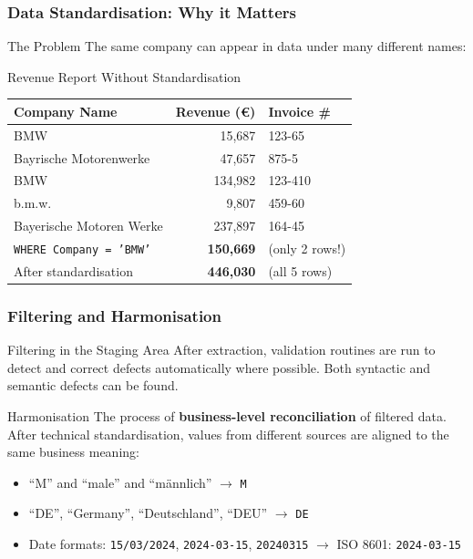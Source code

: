 \begin{frame}
  \frametitle{Data Standardisation: Why it Matters}

  \begin{block}{The Problem}
    The same company can appear in data under many different names:
  \end{block}

  \begin{examples}{Revenue Report Without Standardisation}
    \begin{tabularx}{\linewidth}{@{}l r l@{}}
      \toprule
      \textbf{Company Name}         & \textbf{Revenue (\euro{})} & \textbf{Invoice \#} \\
      \midrule
      BMW                           & 15,687       & 123-65 \\
      Bayrische Motorenwerke        & 47,657       & 875-5  \\
      BMW                           & 134,982      & 123-410 \\
      b.m.w.                        & 9,807        & 459-60 \\
      Bayerische Motoren Werke      & 237,897      & 164-45 \\
      \midrule
      \texttt{WHERE Company = 'BMW'} & \textbf{150,669} & (only 2 rows!) \\
      After standardisation         & \textbf{446,030} & (all 5 rows) \\
      \bottomrule
    \end{tabularx}
  \end{examples}
\end{frame}

\begin{frame}
  \frametitle{Filtering and Harmonisation}

  \begin{block}{Filtering in the Staging Area}
    After extraction, validation routines are run to detect and correct
    defects automatically where possible.
    Both syntactic and semantic defects can be found.
  \end{block}

  \begin{block}{Harmonisation}
    The process of \textbf{business-level reconciliation} of filtered data.
    After technical standardisation, values from different sources are
    aligned to the same business meaning:
    \begin{itemize}
      \item ``M'' and ``male'' and ``männlich'' $\to$ \texttt{M}
      \item ``DE'', ``Germany'', ``Deutschland'', ``DEU'' $\to$ \texttt{DE}
      \item Date formats: \texttt{15/03/2024}, \texttt{2024-03-15},
        \texttt{20240315} $\to$ ISO 8601: \texttt{2024-03-15}
    \end{itemize}
  \end{block}
\end{frame}

